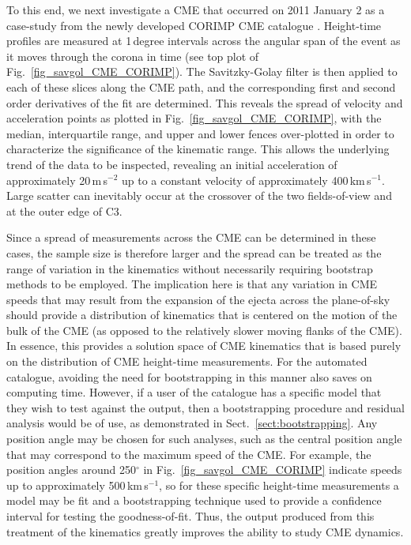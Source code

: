 \documentclass[referee]{aa}
\begin{document}
To this end, we next investigate a CME that occurred on 2011 January 2 as a case-study from the newly developed CORIMP CME catalogue \citep{2012ApJ...752..144M, 2012ApJ...752..145B}. Height-time profiles are measured at 1\,degree intervals across the angular span of the event as it moves through the corona in time (see top plot of Fig.~\ref{fig_savgol_CME_CORIMP}). The Savitzky-Golay filter is then applied to each of these slices along the CME path, and the corresponding first and second order derivatives of the fit are determined. This reveals the spread of velocity and acceleration points as plotted in Fig.~\ref{fig_savgol_CME_CORIMP}, with the median, interquartile range, and upper and lower fences over-plotted in order to characterize the significance of the kinematic range. This allows the underlying trend of the data to be inspected, revealing an initial acceleration of approximately 20\,m\,s$^{-2}$ up to a constant velocity of approximately 400\,km\,s$^{-1}$. Large scatter can inevitably occur at the crossover of the two fields-of-view and at the outer edge of C3.

Since a spread of measurements across the CME can be determined in these cases, the sample size is therefore larger and the spread can be treated as the range of variation in the kinematics without necessarily requiring bootstrap methods to be employed. The implication here is that any variation in CME speeds that may result from the expansion of the ejecta across the plane-of-sky should provide a distribution of kinematics that is centered on the motion of the bulk of the CME (as opposed to the relatively slower moving flanks of the CME). In essence, this provides a solution space of CME kinematics that is based purely on the distribution of CME height-time measurements. For the automated catalogue, avoiding the need for bootstrapping in this manner also saves on computing time. However, if a user of the catalogue has a specific model that they wish to test against the output, then a bootstrapping procedure and residual analysis would be of use, as demonstrated in Sect.~\ref{sect:bootstrapping}. Any position angle may be chosen for such analyses, such as the central position angle that may correspond to the maximum speed of the CME. For example, the position angles around 250$^{\circ}$ in Fig.~\ref{fig_savgol_CME_CORIMP} indicate speeds up to approximately 500\,km\,s$^{-1}$, so for these specific height-time measurements a model may be fit and a bootstrapping technique used to provide a confidence interval for testing the goodness-of-fit. Thus, the output produced from this treatment of the kinematics greatly improves the ability to study CME dynamics.
\end{document}
